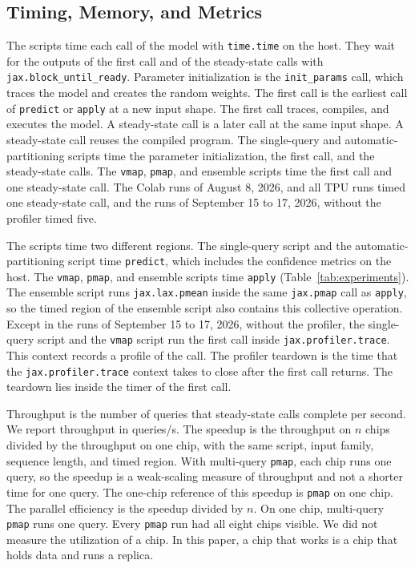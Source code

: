 \subsection{Timing, Memory, and Metrics}\label{sec:timing}
The scripts time each call of the model with \texttt{time.time} on the host. They wait for the outputs of the first
call and of the steady-state calls with \texttt{jax.block\_until\_ready}. Parameter initialization is the
\texttt{init\_params} call, which traces the model and creates the random weights. The first call is the earliest call
of \texttt{predict} or \texttt{apply} at a new input shape. The first call traces, compiles, and executes the model. A
steady-state call is a later call at the same input shape. A steady-state call reuses the compiled program.
 The single-query
and automatic-partitioning scripts time the parameter initialization, the first call, and the steady-state calls.
The
\texttt{vmap}, \texttt{pmap}, and ensemble scripts time the first call and one steady-state call. The Colab runs of August 8, 2026,
and all TPU runs timed one steady-state call, and the runs of September 15 to 17, 2026, without the profiler timed five. %

The scripts time two different regions. The single-query script and the automatic-partitioning script time
\texttt{predict}, which includes the confidence metrics on the host. The \texttt{vmap}, \texttt{pmap}, and ensemble
scripts time \texttt{apply} (Table~\ref{tab:experiments}).
The ensemble script runs \texttt{jax.lax.pmean} inside the same \texttt{jax.pmap} call as \texttt{apply}, so the timed region of the ensemble script also contains this collective operation. %
 Except in the runs of September 15 to 17, 2026, without the profiler, the
single-query script and the \texttt{vmap} script run the first call inside \texttt{jax.profiler.trace}. This context
records a profile of the call. The profiler teardown is the time that the \texttt{jax.profiler.trace} context takes to
close after the first call returns. The teardown lies inside the timer of the first call. %

Throughput is the number of queries that steady-state calls complete per second. We report throughput in queries/s.
The speedup is the throughput on $n$ chips divided by the throughput on one chip, with the same script, input family,
sequence length, and timed region. With multi-query \texttt{pmap}, each chip runs one query, so the speedup is a
weak-scaling measure of throughput and not a shorter time for one query. The one-chip reference of this speedup is
\texttt{pmap} on one chip. The parallel efficiency is the speedup divided by $n$. On one chip, multi-query
\texttt{pmap} runs one query. Every \texttt{pmap} run had all eight chips visible. We did not measure the utilization
of a chip. In this paper, a chip that works is a chip that holds data and runs a replica.

